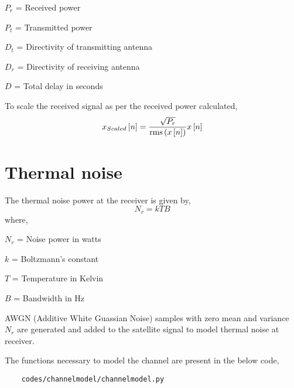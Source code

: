 $P_r$ = Received power

$P_t$ = Transmitted power

$D_t$ = Directivity of transmitting antenna 

$D_r$ = Directivity of receiving antenna 

$D$ = Total delay in seconds

To scale the received signal as per the received power calculated,
\begin{equation}
    x_{Scaled}{}\left[n\right] = \frac{\sqrt{P_r}}{\operatorname{rms}\left(x{}\left[n\right]\right)}x{}\left[n\right]
\end{equation}   

\section{Thermal noise}
The thermal noise power at the receiver is given by,
\begin{equation}
    N_r = k T B
\end{equation}
where,

$N_r$ = Noise power in watts

$k$ = Boltzmann's constant

$T$ = Temperature in Kelvin

$B$ = Bandwidth in Hz

AWGN (Additive White Guassian Noise) samples with zero mean and variance $N_r$ are generated and added to the satellite signal to model thermal noise at receiver.

The functions necessary to model the channel are present in the below code,
\begin{lstlisting}
    codes/channelmodel/channelmodel.py
\end{lstlisting}

